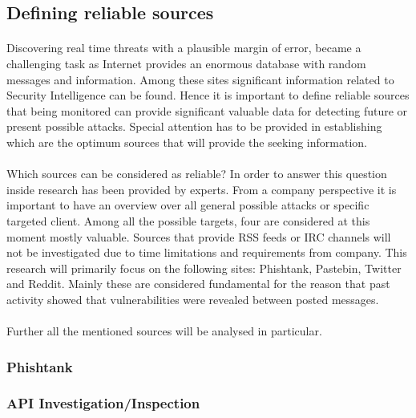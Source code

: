 \documentclass[12pt]{article}
\begin{document}
\subsection{Defining reliable sources}
\parbox{\linewidth}{
\paragraph{}
Discovering real time threats with a plausible margin of error, became a challenging task as Internet provides an enormous database with random messages and information. Among these sites significant information related to Security Intelligence can be found. Hence it is important to define reliable sources that being monitored can provide significant valuable data for detecting future or present possible attacks. Special attention has to be provided in establishing which are the optimum sources that will provide the seeking information. 
\paragraph{}
Which sources can be considered as reliable? In order to answer this question inside research has been provided by experts. From a company perspective it is important to have an overview over all general possible attacks or specific targeted client. Among all the possible targets, four are considered at this moment mostly valuable. Sources that provide RSS feeds or IRC channels will not be investigated due to time limitations and requirements from company. This research will primarily focus on the following sites: Phishtank, Pastebin, Twitter and Reddit. Mainly these are considered fundamental for the reason that past activity showed that vulnerabilities were revealed between posted messages. 
\paragraph{}
Further all the mentioned sources will be analysed in particular.
}
   

\subsubsection*{Phishtank}
\subsubsection{API Investigation/Inspection}
\end{document}
